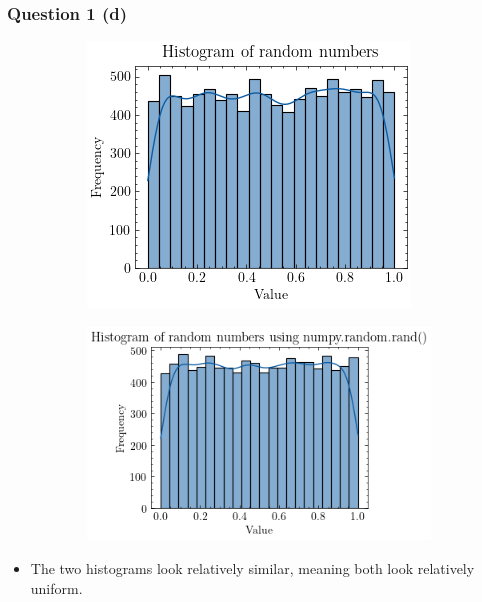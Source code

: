 \documentclass[compress,12pt]{beamer}
\begin{document}
\begin{frame}
      \frametitle{Question 1 (d)}
      \begin{figure}
            \centering
            \begin{subfigure}{0.45\textwidth}
                  \centering
                  \includegraphics[scale=0.5]{imgs/1a.png}
            \end{subfigure}
            \begin{subfigure}{0.45\textwidth}
                  \centering
                  \includegraphics[scale=0.5]{imgs/1d.png}
            \end{subfigure}
      \end{figure}

      \begin{itemize}
            \item The two histograms look relatively similar, meaning both look relatively uniform.
      \end{itemize}
\end{frame}
\end{document}
